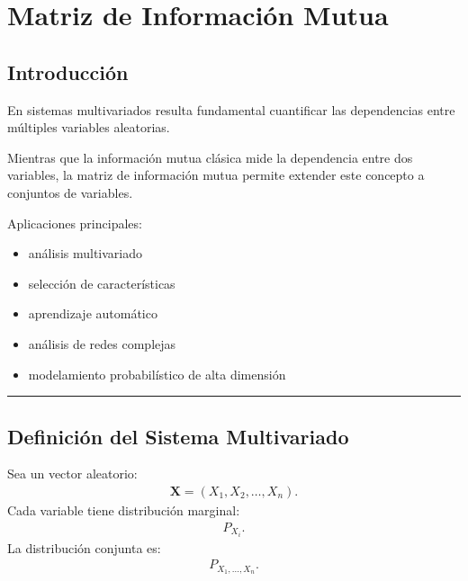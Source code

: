 \documentclass[letterpaper,10pt,english]{jupyterBook}
\begin{document}
\sphinxstepscope


\chapter{Matriz de Información Mutua}
\label{\detokenize{03_multivariate_models/mi_matrix:matriz-de-informacion-mutua}}\label{\detokenize{03_multivariate_models/mi_matrix::doc}}

\section{Introducción}
\label{\detokenize{03_multivariate_models/mi_matrix:introduccion}}
\sphinxAtStartPar
En sistemas multivariados resulta fundamental cuantificar
las dependencias entre múltiples variables aleatorias.

\sphinxAtStartPar
Mientras que la información mutua clásica mide la dependencia
entre dos variables, la matriz de información mutua permite
extender este concepto a conjuntos de variables.

\sphinxAtStartPar
Aplicaciones principales:
\begin{itemize}
\item {} 
\sphinxAtStartPar
análisis multivariado

\item {} 
\sphinxAtStartPar
selección de características

\item {} 
\sphinxAtStartPar
aprendizaje automático

\item {} 
\sphinxAtStartPar
análisis de redes complejas

\item {} 
\sphinxAtStartPar
modelamiento probabilístico de alta dimensión

\end{itemize}


\bigskip\hrule\bigskip



\section{Definición del Sistema Multivariado}
\label{\detokenize{03_multivariate_models/mi_matrix:definicion-del-sistema-multivariado}}
\sphinxAtStartPar
Sea un vector aleatorio:
\begin{equation*}
\begin{split}
\mathbf{X} = (X_1,X_2,\dots,X_n).
\end{split}
\end{equation*}
\sphinxAtStartPar
Cada variable tiene distribución marginal:
\begin{equation*}
\begin{split}
P_{X_i}.
\end{split}
\end{equation*}
\sphinxAtStartPar
La distribución conjunta es:
\begin{equation*}
\begin{split}
P_{X_1,\dots,X_n}.
\end{split}
\end{equation*}
\end{document}
